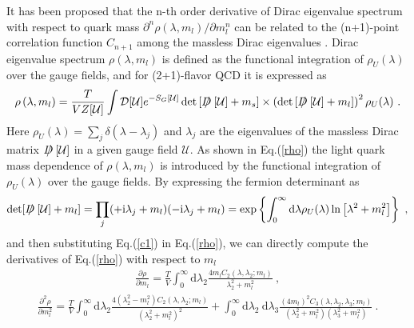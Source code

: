 \documentclass[a4paper,11pt]{article}
\numberwithin{equation}{section}
\begin{document}
It has been proposed that the n-th order derivative of Dirac eigenvalue spectrum with respect to quark mass $\partial^n\rho(\lambda, m_l)/\partial m_l^n$ can be related to the (n+1)-point correlation function $C_{n+1}$ among the massless Dirac eigenvalues \cite{Ding:2020xlj}.
Dirac eigenvalue spectrum $\rho(\lambda, m_l)$ is defined as the functional integration of $\rho_U(\lambda)$ over the gauge fields, and for (2+1)-flavor QCD it is expressed as
\begin{align}\label{rho}
\rho\left(\lambda, m_{l}\right)
=\frac{T}{V Z[\mathcal{U}]}
\int \mathcal{D}[\mathcal{U}] e^{-S_{G}[\mathcal{U}]}
\operatorname{det}\left[ D \mkern -11 mu / ~[\mathcal{U}]+m_{s}\right] 
\times
\left(\operatorname{det}\left[ D \mkern -11 mu / ~[\mathcal{U}]+m_{l}\right]\right)^{2} 
\rho_{U}(\lambda) ~.
\end{align}
Here $\rho_U(\lambda) = \sum_{j} \delta (\lambda-\lambda_{j})$ and $\lambda_j$ are the eigenvalues of  the massless Dirac matrix $D \mkern -11 mu / ~[\mathcal{U}]$ in a given gauge field $\mathcal{U}$. As shown in Eq.(\ref{rho}) the light quark mass dependence of $\rho(\lambda, m_l)$ is introduced by the functional integration of $\rho_U(\lambda)$ over the gauge fields.
By expressing the fermion determinant as \cite{Ding:2020xlj}
\begin{align}
\label{c1}
\operatorname{det}[ D\mkern -11 mu /~[\mathcal{U}]+ m_{l}]
=\prod_{j} (+\mathrm{i} \lambda_{j}+m_{l})(-\mathrm{i} \lambda_{j}+m_{l})
=\exp \left\{
\int_{0}^{\infty} \mathrm{d} \lambda \rho_{U}(\lambda) \ln \left[\lambda^{2}+m_{l}^{2}\right]
\right\}~,
\end{align}
and then substituting Eq.(\ref{c1}) in Eq.(\ref{rho}), we can directly compute the derivatives of Eq.(\ref{rho}) with respect to $m_l$ \cite{Ding:2020xlj}
\begin{equation}
\begin{aligned}
\frac{\partial \rho}{\partial m_{l}}
=\frac{T}{V} \int_{0}^{\infty} \mathrm{d} \lambda_{2} \frac{4 m_{l} C_{2}\left(\lambda, \lambda_{2} ; m_{l}\right)}{\lambda_{2}^{2}+m_{l}^{2}} ~,
\end{aligned}
\end{equation}
\begin{equation}
\begin{aligned}\label{par2expression}
\frac{\partial^{2} \rho}{\partial m_{l}^{2}}
=\frac{T}{V}\int_{0}^{\infty} \mathrm{d} \lambda_{2} \frac{4(\lambda_{2}^{2}-m_{l}^{2}) C_{2}\left(\lambda, \lambda_{2} ; m_{l}\right)}{(\lambda_{2}^{2}+m_{l}^{2})^{2}} 
+\int_{0}^{\infty} \mathrm{d} \lambda_{2} \mathrm{~d} \lambda_{3} \frac{(4 m_{l})^{2} C_{3}\left(\lambda, \lambda_{2}, \lambda_{3} ; m_{l}\right)}{(\lambda_{2}^{2}+m_{l}^{2})(\lambda_{3}^{2}+m_{l}^{2})}~.
\end{aligned}
\end{equation}
\end{document}
